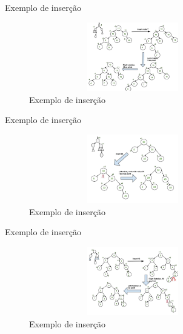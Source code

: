 \begin{frame}
	\begin{block}{Exemplo de inserção}
		\begin{figure}[!htb]
			\centering	  				
			\includegraphics[height=3cm, width = 9cm]{./pic/AVL_exemplo_01.jpg}
			\caption{Exemplo de inserção}
			\label{fig_pilha}
		\end{figure}
	\end{block}
\end{frame}

\begin{frame}
	\begin{block}{Exemplo de inserção}
		\begin{figure}[!htb]
			\centering	  				
			\includegraphics[height=3cm, width = 9cm]{./pic/AVL_exemplo_02.jpg}
			\caption{Exemplo de inserção}
			\label{fig_pilha}
		\end{figure}
	\end{block}
\end{frame}

\begin{frame}
	\begin{block}{Exemplo de inserção}
		\begin{figure}[!htb]
			\centering	  				
			\includegraphics[height=3cm, width = 9cm]{./pic/AVL_exemplo_03.jpg}
			\caption{Exemplo de inserção}
			\label{fig_pilha}
		\end{figure}
	\end{block}
\end{frame}

